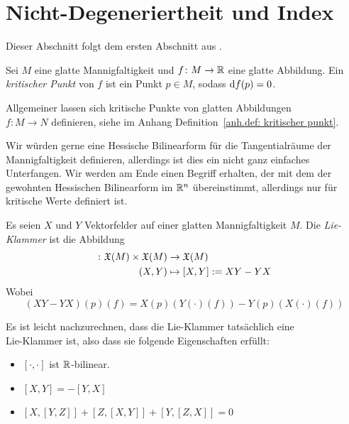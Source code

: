 \section{Nicht-Degeneriertheit und Index}

Dieser Abschnitt folgt dem ersten Abschnitt aus \cite{milnor}.

\begin{definition}
    \label{def: kritischer Punkt}
    Sei $M$ eine glatte Mannigfaltigkeit und $f \colon M \to { \mathbb R }$ eine glatte Abbildung. 
    Ein \textit{kritischer Punkt} von $f$ ist ein Punkt $p \in M$, sodass ${ \operatorname{d} } f (p) = 0$.
\end{definition}

\begin{remark}
    Allgemeiner lassen sich kritische Punkte von glatten Abbildungen \\ $f \colon M \to N$ 
    definieren, siehe im Anhang Definition~\ref{anh.def: kritischer punkt}.
\end{remark}

Wir würden gerne eine Hessische Bilinearform für die Tangentialräume der Mannigfaltigkeit
definieren, allerdings ist dies ein nicht ganz einfaches Unterfangen. Wir werden am Ende
einen Begriff erhalten, der mit dem der gewohnten Hessischen Bilinearform im ${ \mathbb R }^n$
übereinstimmt, allerdings nur für kritische Werte definiert ist.

\begin{definition}
    \label{def: lie-klammer}
    Es seien $X$ und $Y$ Vektorfelder auf einer glatten Mannigfaltigkeit $M$. Die 
    \textit{Lie-Klammer} ist die Abbildung 
    \begin{align*} 
        [\cdot, \cdot] \colon \VFs(M) \times \VFs(M) & \to \VFs(M) \\
        (X, Y) & \mapsto [X, Y] := XY - YX
    \end{align*}
    Wobei 
    \[ (XY - YX) (p) (f) = X(p)(Y(\cdot)(f)) - Y(p)(X(\cdot)(f)) \]
\end{definition}

\begin{remark}
    Es ist leicht nachzurechnen, dass die Lie-Klammer tatsächlich eine \\ Lie-Klammer ist,
    also dass sie folgende Eigenschaften erfüllt:
    \begin{itemize}
        \item $[\cdot, \cdot]$ ist ${ \mathbb R }$-bilinear.
        \item $[X, Y] = -[Y, X]$
        \item $[X, [Y, Z]] + [Z, [X, Y]] + [Y, [Z, X]] = 0$
    \end{itemize}
\end{remark}


